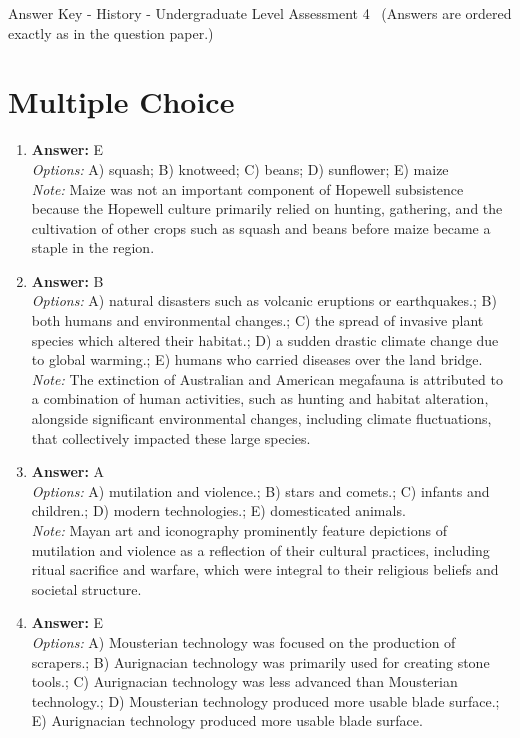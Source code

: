 \documentclass[12pt]{article}
\begin{document}
\begin{center}
Answer Key - History - Undergraduate Level Assessment 4 \
\small (Answers are ordered exactly as in the question paper.)
\end{center}

\section*{Multiple Choice}
\begin{enumerate}[label=\arabic*.]
\item \textbf{Answer:} E
\\ \textit{Options:} A) squash; B) knotweed; C) beans; D) sunflower; E) maize
\\ \textit{Note:} Maize was not an important component of Hopewell subsistence because the Hopewell culture primarily relied on hunting, gathering, and the cultivation of other crops such as squash and beans before maize became a staple in the region.
\item \textbf{Answer:} B
\\ \textit{Options:} A) natural disasters such as volcanic eruptions or earthquakes.; B) both humans and environmental changes.; C) the spread of invasive plant species which altered their habitat.; D) a sudden drastic climate change due to global warming.; E) humans who carried diseases over the land bridge.
\\ \textit{Note:} The extinction of Australian and American megafauna is attributed to a combination of human activities, such as hunting and habitat alteration, alongside significant environmental changes, including climate fluctuations, that collectively impacted these large species.
\item \textbf{Answer:} A
\\ \textit{Options:} A) mutilation and violence.; B) stars and comets.; C) infants and children.; D) modern technologies.; E) domesticated animals.
\\ \textit{Note:} Mayan art and iconography prominently feature depictions of mutilation and violence as a reflection of their cultural practices, including ritual sacrifice and warfare, which were integral to their religious beliefs and societal structure.
\item \textbf{Answer:} E
\\ \textit{Options:} A) Mousterian technology was focused on the production of scrapers.; B) Aurignacian technology was primarily used for creating stone tools.; C) Aurignacian technology was less advanced than Mousterian technology.; D) Mousterian technology produced more usable blade surface.; E) Aurignacian technology produced more usable blade surface.

\end{enumerate}
\end{document}
